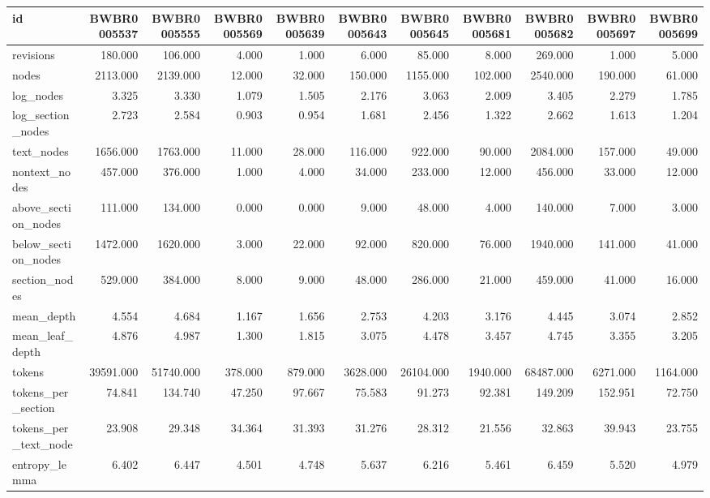 \begin{tabular}{lrrrrrrrrrr}
\toprule
id & BWBR0005537 & BWBR0005555 & BWBR0005569 & BWBR0005639 & BWBR0005643 & BWBR0005645 & BWBR0005681 & BWBR0005682 & BWBR0005697 & BWBR0005699 \\
\midrule
revisions & 180.000 & 106.000 & 4.000 & 1.000 & 6.000 & 85.000 & 8.000 & 269.000 & 1.000 & 5.000 \\
\cline{1-11}
nodes & 2113.000 & 2139.000 & 12.000 & 32.000 & 150.000 & 1155.000 & 102.000 & 2540.000 & 190.000 & 61.000 \\
\cline{1-11}
log\_nodes & 3.325 & 3.330 & 1.079 & 1.505 & 2.176 & 3.063 & 2.009 & 3.405 & 2.279 & 1.785 \\
\cline{1-11}
log\_section\_nodes & 2.723 & 2.584 & 0.903 & 0.954 & 1.681 & 2.456 & 1.322 & 2.662 & 1.613 & 1.204 \\
\cline{1-11}
text\_nodes & 1656.000 & 1763.000 & 11.000 & 28.000 & 116.000 & 922.000 & 90.000 & 2084.000 & 157.000 & 49.000 \\
\cline{1-11}
nontext\_nodes & 457.000 & 376.000 & 1.000 & 4.000 & 34.000 & 233.000 & 12.000 & 456.000 & 33.000 & 12.000 \\
\cline{1-11}
above\_section\_nodes & 111.000 & 134.000 & 0.000 & 0.000 & 9.000 & 48.000 & 4.000 & 140.000 & 7.000 & 3.000 \\
\cline{1-11}
below\_section\_nodes & 1472.000 & 1620.000 & 3.000 & 22.000 & 92.000 & 820.000 & 76.000 & 1940.000 & 141.000 & 41.000 \\
\cline{1-11}
section\_nodes & 529.000 & 384.000 & 8.000 & 9.000 & 48.000 & 286.000 & 21.000 & 459.000 & 41.000 & 16.000 \\
\cline{1-11}
mean\_depth & 4.554 & 4.684 & 1.167 & 1.656 & 2.753 & 4.203 & 3.176 & 4.445 & 3.074 & 2.852 \\
\cline{1-11}
mean\_leaf\_depth & 4.876 & 4.987 & 1.300 & 1.815 & 3.075 & 4.478 & 3.457 & 4.745 & 3.355 & 3.205 \\
\cline{1-11}
tokens & 39591.000 & 51740.000 & 378.000 & 879.000 & 3628.000 & 26104.000 & 1940.000 & 68487.000 & 6271.000 & 1164.000 \\
\cline{1-11}
tokens\_per\_section & 74.841 & 134.740 & 47.250 & 97.667 & 75.583 & 91.273 & 92.381 & 149.209 & 152.951 & 72.750 \\
\cline{1-11}
tokens\_per\_text\_node & 23.908 & 29.348 & 34.364 & 31.393 & 31.276 & 28.312 & 21.556 & 32.863 & 39.943 & 23.755 \\
\cline{1-11}
entropy\_lemma & 6.402 & 6.447 & 4.501 & 4.748 & 5.637 & 6.216 & 5.461 & 6.459 & 5.520 & 4.979 \\

\end{tabular}

